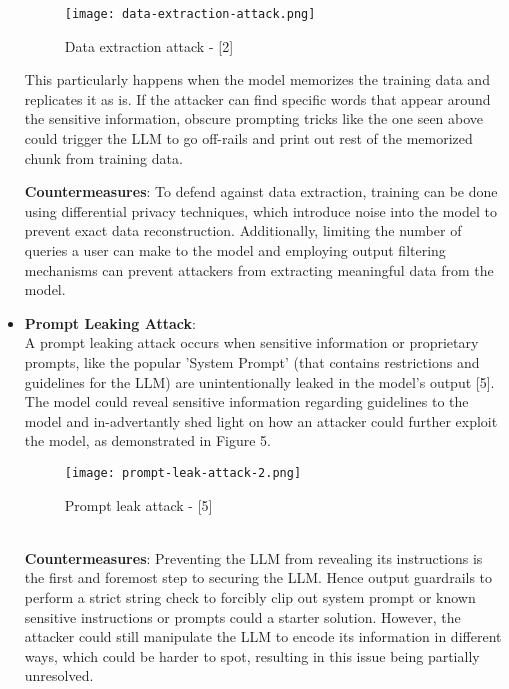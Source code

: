 \documentclass[12pt]{article}
\begin{document}
\begin{itemize}
        \begin{figure}[ht!]
            \centering
            \texttt{[image: data-extraction-attack.png]}
            \caption{Data extraction attack - [2]}
            \label{fig:data extraction attack}
        \end{figure}

        This particularly happens when the model memorizes the training data and replicates it as is. If the attacker can find specific words that appear around the sensitive information, obscure prompting tricks like the one seen above could trigger the LLM to go off-rails and print out rest of the memorized chunk from training data.

        \textbf{Countermeasures}: To defend against data extraction, training can be done using differential privacy techniques, which introduce noise into the model to prevent exact data reconstruction. Additionally, limiting the number of queries a user can make to the model and employing output filtering mechanisms can prevent attackers from extracting meaningful data from the model. \\

        \item \textbf{Prompt Leaking Attack}: \\
        A prompt leaking attack occurs when sensitive information or proprietary prompts, like the popular 'System Prompt' (that contains restrictions and guidelines for the LLM) are unintentionally leaked in the model’s output [5]. The model could reveal sensitive information regarding guidelines to the model and in-advertantly shed light on how an attacker could further exploit the model, as demonstrated in Figure 5.
        \begin{figure}[h!]
            \centering
            \texttt{[image: prompt-leak-attack-2.png]}
            \caption{Prompt leak attack - [5]}
            \label{fig:enter-label}
        \end{figure} \\
        \textbf{Countermeasures}: Preventing the LLM from revealing its instructions is the first and foremost step to securing the LLM. Hence output guardrails to perform a strict string check to forcibly clip out system prompt or known sensitive instructions or prompts could a starter solution. However, the attacker could still manipulate the LLM to encode its information in different ways, which could be harder to spot, resulting in this issue being partially unresolved.\\



\end{itemize}
\end{document}
